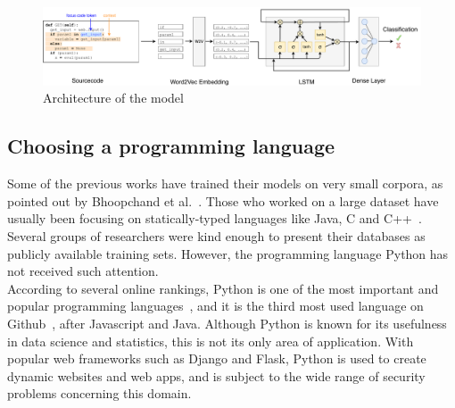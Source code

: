 \documentclass[
a4paper,
pagesize,
pdftex,
12pt,
twoside, %
BCOR=5mm, %
ngerman,
fleqn,
final,
]{scrartcl}
\begin{document}
	\begin{figure}[ht]
		\centering
		\includegraphics[width=\linewidth]{img/Architecture}
		\caption{Architecture of the model}
		\label{fig:architecture}
	\end{figure}
	
	
	\subsection{Choosing a programming language}
	Some of the previous works have trained their models on very small corpora, as pointed out by Bhoopchand et al.~\cite{Bhoopchand.2016}. Those who worked on a large dataset have usually been focusing on statically-typed languages like Java, C and C++~\cite{Bellon.2007,Russell.2018,Liu.2018,Dam.2017, Rolim.2018}. Several groups of researchers were kind enough to present their databases as publicly available training sets. However, the programming language Python has not received such attention. \\
	According to several online rankings, Python is one of the most important and popular programming languages~\cite{AyeshaCuthbert.15.4.2019, VidushiDwivedi.}, and it is the third most used language on Github~\cite{Github.com.19}, after Javascript and Java. Although Python is known for its usefulness in data science and statistics, this is not its only area of application. With popular web frameworks such as Django and Flask, Python is used to create dynamic websites and web apps, and is subject to the wide range of security problems concerning this domain.\\
	
\end{document}
